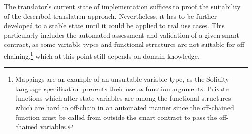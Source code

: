 The translator's current state of implementation suffices to proof the suitability of the described translation approach. Nevertheless, it has to be further developed to a stable state until it could be applied to real use cases. This particularly includes the automated assessment and validation of a given smart contract, as some variable types and functional structures are not suitable for off-chaining,\footnote{Mappings are an example of an unsuitable variable type, as the Solidity language specification prevents their use as function arguments. Private functions which alter state variables are among the functional structures which are hard to off-chain in an automated manner since the off-chained function must be called from outside the smart contract to pass the off-chained variables.} which at this point still depends on domain knowledge.
